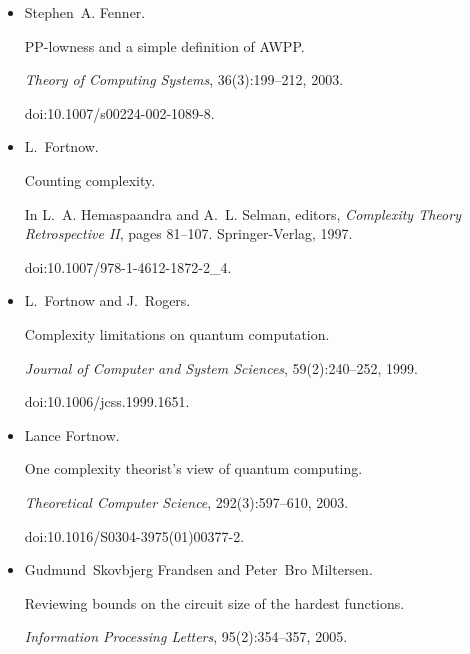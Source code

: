 \documentclass[10pt,a4paper]{article}
\begin{document}
\begin{itemize}
doi:10.1016/S0890-5401(03)00018-X.





\item[] 
[20]

Stephen A. Fenner.


PP-lowness and a simple definition of AWPP.


\emph{Theory of Computing Systems}, 36(3):199–212, 2003.


doi:10.1007/s00224-002-1089-8.





\item[] 
[21]

L. Fortnow.


Counting complexity.


In L. A. Hemaspaandra and A. L. Selman, editors, \emph{Complexity
Theory Retrospective II}, pages 81–107. Springer-Verlag, 1997.


doi:10.1007/978-1-4612-1872-2\_4.





\item[] 
[22]

L. Fortnow and J. Rogers.


Complexity limitations on quantum computation.


\emph{Journal of Computer and System Sciences}, 59(2):240–252, 1999.


doi:10.1006/jcss.1999.1651.





\item[] 
[23]

Lance Fortnow.


One complexity theorist’s view of quantum computing.


\emph{Theoretical Computer Science}, 292(3):597–610, 2003.


doi:10.1016/S0304-3975(01)00377-2.





\item[] 
[24]

Gudmund Skovbjerg Frandsen and Peter Bro Miltersen.


Reviewing bounds on the circuit size of the hardest functions.


\emph{Information Processing Letters}, 95(2):354–357, 2005.



\end{itemize}
\end{document}
